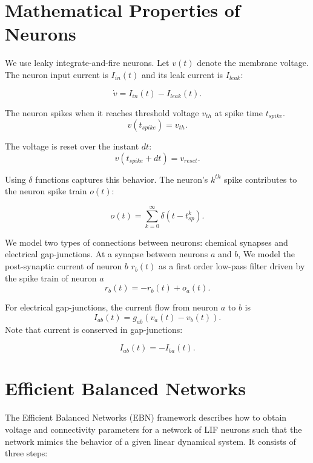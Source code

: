 \documentclass{article}
\begin{document}
\section{Mathematical Properties of Neurons}
We use leaky integrate-and-fire neurons. Let $v(t)$ denote the membrane voltage. The neuron input current is  $I_{in}(t)$ and its leak current is $I_{leak}$:

\begin{equation}
\dot{v} = I_{in}(t) - I_{leak}(t).
\end{equation}

The neuron spikes when it reaches threshold voltage $v_{th}$ at spike time $t_{spike}$.
\begin{equation}
v(t_{spike}) = v_{th}.
\end{equation}

The voltage is reset over the instant $dt$: 
\begin{equation}
v(t_{spike} + dt) = v_{reset}.
\end{equation}

Using $\delta$ functions captures this behavior. The neuron's $k^{th}$ spike contributes to the neuron spike train $o(t)$:

\begin{equation}
o(t) = \sum_{k=0}^\infty \delta(t - t_{sp}^k).
\end{equation}

We model two types of connections between neurons: chemical synapses and electrical gap-junctions. At a synapse between neurons $a$ and $b$, We model the post-synaptic current of neuron $b$ $r_b(t)$ as a first order low-pass filter driven by the spike train of neuron $a$
\begin{equation}
\label{eq:r}
r_{b}(t) = -r_b(t) + o_a(t).
\end{equation}

For electrical gap-junctions, the current flow from neuron $a$ to $b$ is 
\begin{equation}
I_{ab}(t) = g_{ab}(v_a(t) - v_b(t)).
\end{equation}
Note that current is conserved in gap-junctions:

\begin{equation}
I_{ab}(t) = - I_{ba}(t).
\end{equation}


\section{Efficient Balanced Networks}
The Efficient Balanced Networks (EBN) framework describes how to obtain voltage and connectivity parameters for a network of LIF neurons such that the network mimics the behavior of a given linear dynamical system.  It consists of three steps:
\end{document}
